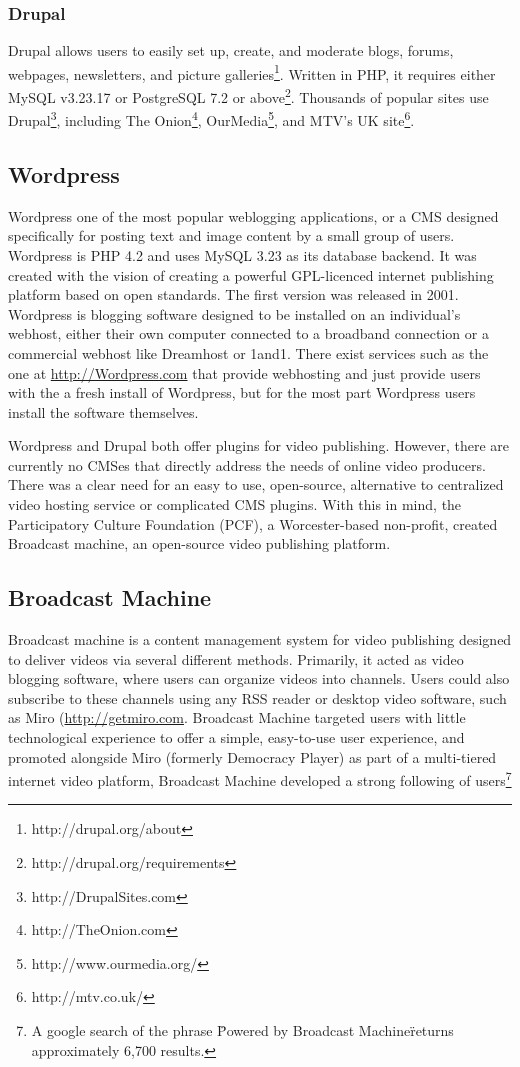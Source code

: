 \documentclass[a4paper,12pt]{report}
\begin{document}
\subsubsection{Drupal}
Drupal allows users to easily set up, create, and moderate blogs, forums, webpages, newsletters, and picture galleries\footnote{http://drupal.org/about}.
Written in PHP, it requires either MySQL v3.23.17 or PostgreSQL 7.2 or above\footnote{http://drupal.org/requirements}.
Thousands of popular sites use Drupal\footnote{http://DrupalSites.com}, including The Onion\footnote{ http://TheOnion.com}, OurMedia\footnote{http://www.ourmedia.org/}, and MTV's UK site\footnote{http://mtv.co.uk/}.

\subsection{Wordpress}
Wordpress one of the most popular weblogging applications, or a CMS designed specifically for posting text and image content by a small group of users.
Wordpress is PHP 4.2 and uses MySQL 3.23 as its database backend. 
It was created with the vision of creating a powerful GPL-licenced internet publishing platform based on open standards. 
The first version was released in 2001. 
Wordpress is blogging software designed to be installed on an individual's webhost, either their own computer connected to a broadband connection or a commercial webhost like Dreamhost or 1and1. There exist services such as the one at \url{http://Wordpress.com} that provide webhosting and just provide users with the a fresh install of Wordpress, but for the most part Wordpress users install the software themselves. 

Wordpress and Drupal both offer plugins for video publishing. However, there are currently no CMSes that directly address the needs of online video producers. There was a clear need for an easy to use, open-source, alternative to centralized video hosting service or complicated CMS plugins. With this in mind, the Participatory Culture Foundation (PCF), a Worcester-based non-profit, created Broadcast machine, an open-source video publishing platform.

\subsection {Broadcast Machine}
Broadcast machine is a content management system for video publishing designed to deliver videos via several different methods. Primarily, it acted as video blogging software, where users can organize videos into channels. Users could also subscribe to these channels using any RSS reader or desktop video software, such as Miro (\url{http://getmiro.com}. Broadcast Machine targeted users with little technological experience to offer a simple, easy-to-use user experience, and promoted alongside Miro (formerly Democracy Player) as part of a multi-tiered internet video platform, Broadcast Machine developed a strong following of users\footnote{A google search of the phrase \"Powered by Broadcast Machine\" returns approximately 6,700 results.}
\end{document}
